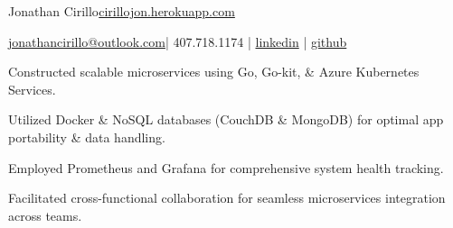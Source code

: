 \documentclass[]{deedy-resume-openfont}
\begin{document}
%
%


\namesection \LARGE {{Jonathan} {Cirillo}}{\href{https://cirillojon.herokuapp.com/}{cirillojon.herokuapp.com}}

\vspace{18pt}

\newcommand{\linkedin}[1]{\faLinkedin\hspace{0.5em}\href{https://linkedin.com/in/#1}{\texttt{#1}}}
\newcommand{\github}[1]{\faGithub\hspace{0.5em}\href{https://github.com/#1}{\texttt{#1}}}

{\FA \faEnvelope} {\href{mailto:jonathancirillo@outlook.com}{jonathancirillo@outlook.com}}\hspace{5pt}|\hspace{5pt}{\FA \faPhone} 407.718.1174 |\hspace{5pt} {\FA \faLinkedin} {\href{https://linkedin.com/in/jonathan-cirillo/}{linkedin}} \hspace{5pt}|\hspace{5pt} {\FA \faGithub} {\href{https://github.com/cirillojon}{github}}


\vspace{6pt}



\begin{tightemize}
\item Constructed scalable microservices using Go, Go-kit, \& Azure Kubernetes Services.
\item Utilized Docker \& NoSQL databases (CouchDB \& MongoDB) for optimal app portability \& data handling.
\item Employed Prometheus and Grafana for comprehensive system health tracking.
\item Facilitated cross-functional collaboration for seamless microservices integration across teams.
\end{tightemize}
\sectionsep
\end{document}
